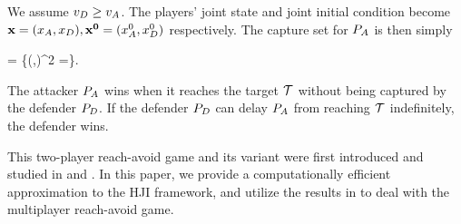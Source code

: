 We assume $v_D \ge v_A$. The players' joint state and joint initial condition become $\mathbf{x}=(x_A,x_D),\mathbf{x^0}=(x_A^0,x_D^0)$ respectively. The capture set for $P_A$ is then simply 

\bq
\label{eq:2p_avoid}
\avoid = \left\{(\xa,\xb)\in\amb^2 \mid \xa=\xb\right\}. 
\eq

The attacker $P_A$ wins when it reaches the target $\mathcal{T}$ without being captured by the defender $P_D$. If the defender $P_D$ can delay $P_A$ from reaching $\mathcal{T}$ indefinitely, the defender wins.

This two-player reach-avoid game and its variant were first introduced and studied in \cite{Huang2011} and \cite{Zhou2012}. In this paper, we provide a computationally efficient approximation to the HJI framework, and utilize the results in \cite{Chen2014} to deal with the multiplayer reach-avoid game.

